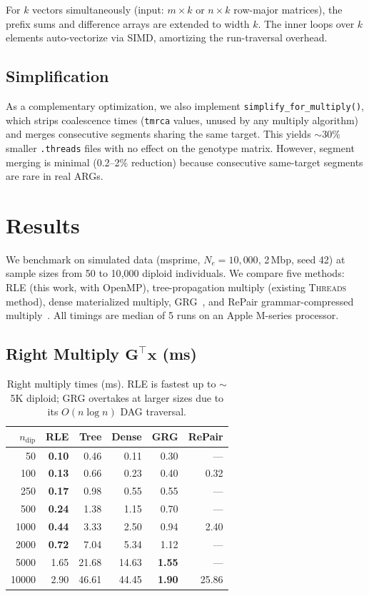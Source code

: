 \documentclass[11pt]{article}
\begin{document}
For $k$ vectors simultaneously (input: $m \times k$ or $n \times k$
row-major matrices), the prefix sums and difference arrays are extended to
width $k$.  The inner loops over $k$ elements auto-vectorize via SIMD,
amortizing the run-traversal overhead.

\subsection{Simplification}

As a complementary optimization, we also implement
\texttt{simplify\_for\_multiply()}, which strips coalescence times
(\texttt{tmrca} values, unused by any multiply algorithm) and merges
consecutive segments sharing the same target.  This yields $\sim$30\%
smaller \texttt{.threads} files with no effect on the genotype matrix.
However, segment merging is minimal (0.2--2\% reduction) because
consecutive same-target segments are rare in real ARGs.

\section{Results}

We benchmark on simulated data (msprime, $N_e = 10{,}000$, 2\,Mbp, seed
42) at sample sizes from 50 to 10{,}000 diploid individuals.  We compare
five methods: RLE (this work, with OpenMP), tree-propagation multiply
(existing \textsc{Threads} method), dense materialized multiply,
GRG~\cite{dehaas2024}, and RePair grammar-compressed
multiply~\cite{tosoni2022}.  All timings are median of 5 runs on an Apple
M-series processor.

\subsection{Right Multiply $\mathbf{G}^\top \mathbf{x}$ (ms)}

\begin{table}[h]
\centering
\begin{tabular}{r rrrrr}
\toprule
$n_\text{dip}$ & RLE & Tree & Dense & GRG & RePair \\
\midrule
50    & \textbf{0.10}  & 0.46  & 0.11  & 0.30  & ---   \\
100   & \textbf{0.13}  & 0.66  & 0.23  & 0.40  & 0.32  \\
250   & \textbf{0.17}  & 0.98  & 0.55  & 0.55  & ---   \\
500   & \textbf{0.24}  & 1.38  & 1.15  & 0.70  & ---   \\
1000  & \textbf{0.44}  & 3.33  & 2.50  & 0.94  & 2.40  \\
2000  & \textbf{0.72}  & 7.04  & 5.34  & 1.12  & ---   \\
5000  & 1.65  & 21.68 & 14.63 & \textbf{1.55}  & ---   \\
10000 & 2.90  & 46.61 & 44.45 & \textbf{1.90}  & 25.86 \\
\bottomrule
\end{tabular}
\caption{Right multiply times (ms).  RLE is fastest up to $\sim$5K diploid;
GRG overtakes at larger sizes due to its $O(n\log n)$ DAG traversal.}
\label{tab:right}
\end{table}
\end{document}
